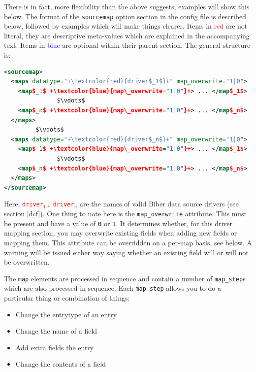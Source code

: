 \documentclass{ltxdockit}
\begin{document}
\noindent There is in fact, more flexibility than the above suggests,
examples will show this below. The format of the \verb+sourcemap+ option
section in the config file is described below, followed by examples which
will make things clearer. Items in \textcolor{red}{red} are not literal,
they are descriptive meta-values which are explained in the accompanying
text. Items in \textcolor{blue}{blue} are optional within their parent
section. The general structure is:

\lstset{showspaces=false}
\lstset{showstringspaces=false}
\begin{lstlisting}[language=xml,escapechar=+,mathescape=true]
<sourcemap>
  <maps datatype="+\textcolor{red}{driver$_1$}+" map_overwrite="1|0">
    <map$_1$ +\textcolor{blue}{map\_overwrite="1|0"}+> ... </map$_1$>
               $\vdots$
    <map$_n$ +\textcolor{blue}{map\_overwrite="1|0"}+> ... </map$_n$>
  </maps>
         $\vdots$
  <maps datatype="+\textcolor{red}{driver$_n$}+" map_overwrite="1|0">
    <map$_1$ +\textcolor{blue}{map\_overwrite="1|0"}+> ... </map$_1$>
               $\vdots$
    <map$_n$ +\textcolor{blue}{map\_overwrite="1|0"}+> ... </map$_n$>
  </maps>
</sourcemap>
\end{lstlisting}

\noindent Here, \textcolor{red}{\texttt{driver$_1$}}\ldots
\textcolor{red}{\texttt{driver$_n$}} are the names of valid Biber data
source drivers (see section \ref{dcf}). One thing to note here is the
\verb+map_overwrite+ attribute. This must be present and have a value of
\verb+0+ or \verb+1+. It determines whether, for this driver mapping
section, you may overwrite existing fields when adding new fields
or mapping them. This attribute can be overridden on a per-map basis, see
below. A warning will be issued either way saying whether an existing field
will or will not be overwritten.

The \verb+map+ elements are processed in sequence and contain a number of
\verb+map_step+s which are also processed in sequence. Each \verb+map_step+
allows you to do a particular thing or combination of things:

\begin{itemize}
\item Change the entrytype of an entry
\item Change the name of a field
\item Add extra fields the entry
\item Change the contents of a field
\end{itemize}
\end{document}
